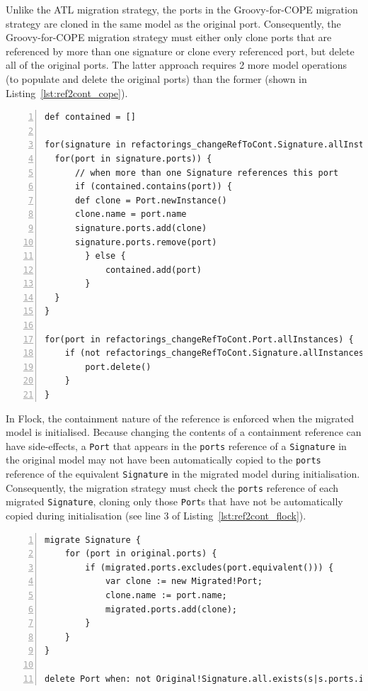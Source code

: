 Unlike the ATL migration strategy, the ports in the Groovy-for-COPE migration strategy are cloned in the same model as the original port. Consequently, the Groovy-for-COPE migration strategy must either only clone ports that are referenced by more than one signature or clone every referenced port, but delete all of the original ports. The latter approach requires 2 more model operations (to populate and delete the original ports) than the former (shown in Listing~\ref{lst:ref2cont_cope}).

\begin{lstlisting}[basicstyle=\ttfamily\footnotesize, flexiblecolumns=true, numbers=left, nolol=true, caption=Change R to C model migration in COPE, label=lst:ref2cont_cope, language=COPE, tabsize=2]
def contained = []

for(signature in refactorings_changeRefToCont.Signature.allInstances) {
  for(port in signature.ports)) {
	  // when more than one Signature references this port
	  if (contained.contains(port)) {
      def clone = Port.newInstance()
      clone.name = port.name
      signature.ports.add(clone)
      signature.ports.remove(port)
		} else {
			contained.add(port)
		}
  }
}

for(port in refactorings_changeRefToCont.Port.allInstances) {
	if (not refactorings_changeRefToCont.Signature.allInstances.any { it.ports.contains(port) }) {
	  	port.delete()
	}
}
\end{lstlisting}

In Flock, the containment nature of the reference is enforced when the migrated model is initialised. Because changing the contents of a containment reference can have side-effects, a \texttt{Port} that appears in the \texttt{ports} reference of a \texttt{Signature} in the original model may not have been automatically copied to the \texttt{ports} reference of the equivalent \texttt{Signature} in the migrated model during initialisation. Consequently, the migration strategy must check the \texttt{ports} reference of each migrated \texttt{Signature}, cloning only those \texttt{Port}s that have not be automatically copied during initialisation (see line 3 of Listing~\ref{lst:ref2cont_flock}).

\begin{lstlisting}[basicstyle=\ttfamily\footnotesize, flexiblecolumns=true, numbers=left, nolol=true, caption=Change R to C model migration in Flock, label=lst:ref2cont_flock, language=Flock, tabsize=2]
migrate Signature {
	for (port in original.ports) {
		if (migrated.ports.excludes(port.equivalent())) {
			var clone := new Migrated!Port;
			clone.name := port.name;
			migrated.ports.add(clone);
		}
	}
}

delete Port when: not Original!Signature.all.exists(s|s.ports.includes(original))
\end{lstlisting}

